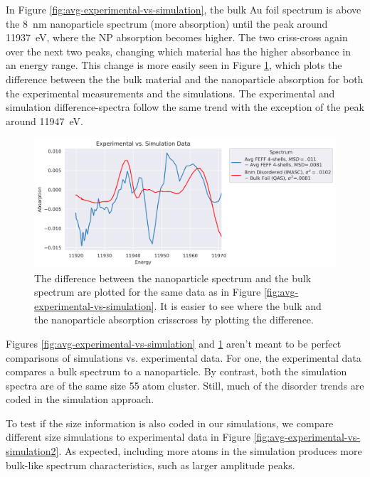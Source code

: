In Figure \ref{fig:avg-experimental-vs-simulation}, the bulk Au foil spectrum is above the 8~nm nanoparticle spectrum (more absorption) until the peak around 11937~eV, where the NP absorption becomes higher. The two criss-cross again over the next two peaks, changing which material has the higher absorbance in an energy range. This change is more easily seen in Figure \ref{fig:avg-experimential-vs-simulation-difference}, which plots the difference between the the bulk material and the nanoparticle absorption for both the experimental measurements and the simulations. The experimental and simulation difference-spectra follow the same trend with the exception of the peak around 11947~eV.


\begin{figure}[h!]
	\centering
	\includegraphics[width=\linewidth]{Chapters/Figures/experimental_vs_simulation_delta.png}
	\caption[Bulk-nanoparticle difference: Simulation vs. Experimental data]{The difference between the nanoparticle spectrum and the bulk spectrum are plotted for the same data as in Figure \ref{fig:avg-experimental-vs-simulation}. It is easier to see where the bulk and the nanoparticle absorption crisscross by plotting the difference.}
	\label{fig:avg-experimential-vs-simulation-difference}
\end{figure}

Figures \ref{fig:avg-experimental-vs-simulation} and \ref{fig:avg-experimential-vs-simulation-difference} aren't meant to be perfect comparisons of simulations vs. experimental data. For one, the experimental data compares a bulk spectrum to a nanoparticle. By contrast, both the simulation spectra are of the same size 55 atom cluster. Still, much of the disorder trends are coded in the simulation approach. 

To test if the size information is also coded in our simulations, we compare different size simulations to experimental data in Figure \ref{fig:avg-experimental-vs-simulation2}. As expected, including more atoms in the simulation produces more bulk-like spectrum characteristics, such as larger amplitude peaks.

